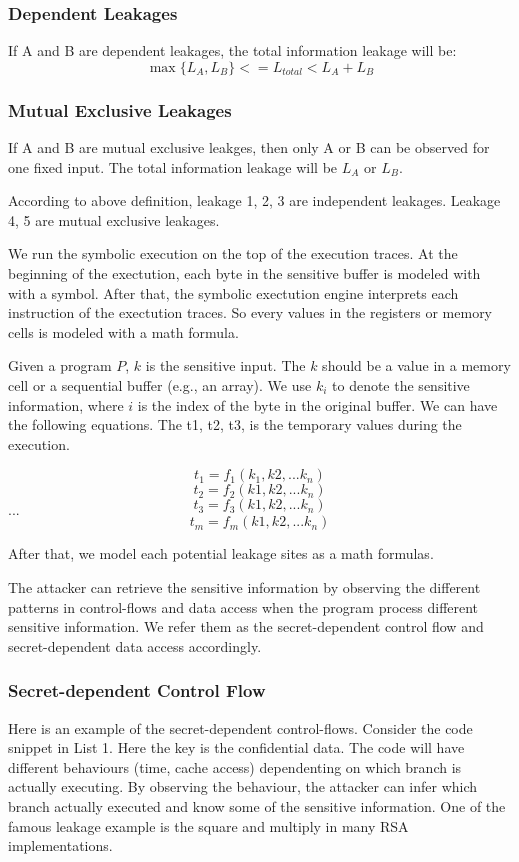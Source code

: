 \subsubsection{Dependent Leakages}
If A and B are dependent leakages, the total information leakage will be:
\begin{displaymath}
\label{dependent leakage}
    \max{\{L_A, L_B\}}  <= L_{total} < L_A + L_B 
\end{displaymath}

\subsubsection{Mutual Exclusive Leakages}
If A and B are mutual exclusive leakges, then only A or B can be observed for one fixed input.
The total information leakage will be $L_A$ or $L_B$.

According to above definition, leakage 1, 2, 3 are independent leakages. Leakage 4, 5
are mutual exclusive leakages. 

We run the symbolic execution on the top of the execution traces. At the beginning of the exectution,
each byte in the sensitive buffer is modeled with with a symbol. After that, the symbolic
exectution engine interprets each instruction of the exectution traces. So every values in the
registers or memory cells is modeled with a math formula.

Given a program $P$, $k$ is the sensitive input. The $k$ should be a value in a memory cell or a sequential 
buffer (e.g., an array). We use $k_i$ to denote the sensitive information, where $i$ is the index of the byte in
the original buffer. We can have the following equations. The t1, t2, t3, is the temporary values during the execution.

$$t_1 = f_1(k_1, k2, ... k_n)$$
$$t_2 = f_2(k1, k2, ... k_n)$$
$$t_3 = f_3(k1, k2, ... k_n)$$
$...$
$$t_m = f_m(k1, k2, ... k_n)$$

After that, we model each potential leakage sites as a math formulas.

The attacker can retrieve the sensitive information by observing the different patterns in 
control-flows and data access when the program process different sensitive information. 
We refer them as the secret-dependent control flow and secret-dependent data access accordingly.


\subsubsection{Secret-dependent Control Flow}
Here is an example of the secret-dependent control-flows. Consider the code snippet in List 1. 
Here the key is the confidential data. The code will have different behaviours (time, cache access) 
dependenting on which branch is actually executing. By observing the behaviour, 
the attacker can infer which branch actually executed and know some of the sensitive information. 
One of the famous leakage example is the square and multiply in many RSA implementations. 

